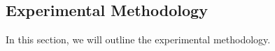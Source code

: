 \vspace{-0.3cm}
\subsection{Experimental Methodology} \label{5.1}
In this section, we will outline the experimental methodology.

